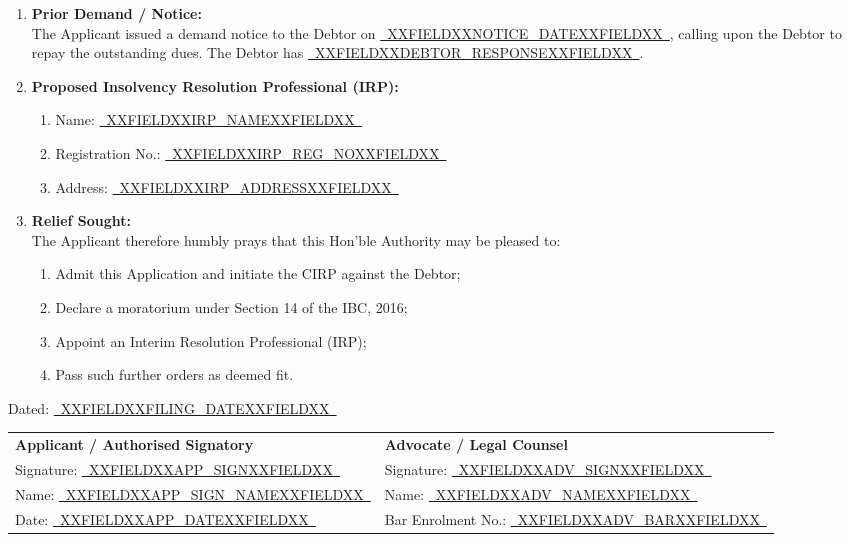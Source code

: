 \documentclass[12pt,a4paper]{article}
\newcommand{\fillline}[1]{\underline{~#1~}}
\begin{document}
\begin{enumerate}[label=\textbf{\arabic*.}, leftmargin=*, itemsep=1em]
    \item \textbf{Prior Demand / Notice:}\\
    The Applicant issued a demand notice to the Debtor on \fillline{XXFIELDXXNOTICE_DATEXXFIELDXX},
    calling upon the Debtor to repay the outstanding dues. The Debtor has
    \fillline{XXFIELDXXDEBTOR_RESPONSEXXFIELDXX}.

    \item \textbf{Proposed Insolvency Resolution Professional (IRP):}
    \begin{enumerate}[label=(\alph*)]
        \item Name: \fillline{XXFIELDXXIRP_NAMEXXFIELDXX}
        \item Registration No.: \fillline{XXFIELDXXIRP_REG_NOXXFIELDXX}
        \item Address: \fillline{XXFIELDXXIRP_ADDRESSXXFIELDXX}
    \end{enumerate}

    \item \textbf{Relief Sought:}\\
    The Applicant therefore humbly prays that this Hon'ble Authority may be pleased to:
    \begin{enumerate}[label=(\alph*)]
        \item Admit this Application and initiate the CIRP against the Debtor;
        \item Declare a moratorium under Section 14 of the IBC, 2016;
        \item Appoint an Interim Resolution Professional (IRP);
        \item Pass such further orders as deemed fit.
    \end{enumerate}

\end{enumerate}

\vspace{1.5em}

\noindent Dated: \fillline{XXFIELDXXFILING_DATEXXFIELDXX}

\vspace{1em}

\noindent
\begin{tabularx}{\textwidth}{@{}X X@{}}
    \textbf{Applicant / Authorised Signatory} & \textbf{Advocate / Legal Counsel}\\[1.5em]
    Signature: \fillline{XXFIELDXXAPP_SIGNXXFIELDXX} & Signature: \fillline{XXFIELDXXADV_SIGNXXFIELDXX}\\[0.5em]
    Name: \fillline{XXFIELDXXAPP_SIGN_NAMEXXFIELDXX} & Name: \fillline{XXFIELDXXADV_NAMEXXFIELDXX}\\[0.5em]
    Date: \fillline{XXFIELDXXAPP_DATEXXFIELDXX} & Bar Enrolment No.: \fillline{XXFIELDXXADV_BARXXFIELDXX}\\
\end{tabularx}
\end{document}
